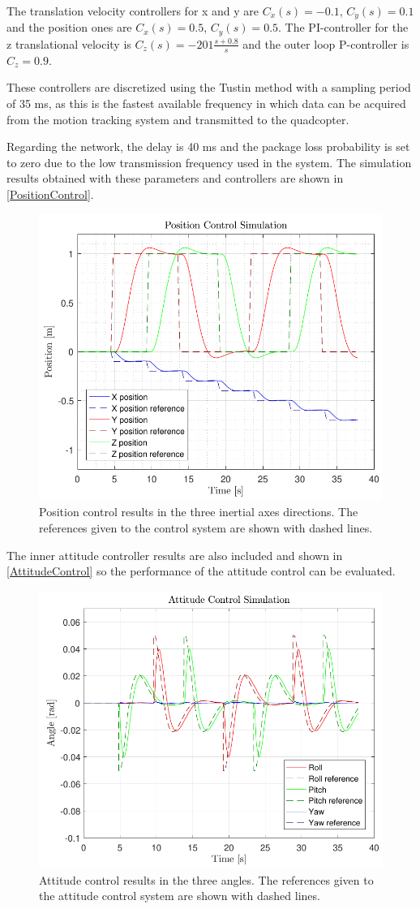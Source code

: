 The translation velocity controllers for x and y are $C_{\dot{x}}(s)= -0.1$, $C_{\dot{y}}(s)= 0.1$ and the position ones are $C_x(s)= 0.5$, $C_y(s)= 0.5$. The PI-controller for the z translational velocity is $C_{\dot{z}}(s)=-201\frac{s+0.8}{s}$ and the outer loop P-controller is $C_z=0.9$.

These controllers are discretized using the Tustin method with a sampling period of 35 ms, as this is the fastest available frequency in which data can be acquired from the motion tracking system and transmitted to the quadcopter.

Regarding the network, the delay is 40 ms and the package loss probability is set to zero due to the low transmission frequency used in the system.
The simulation results obtained with these parameters and controllers are shown in \autoref{PositionControl}.
\begin{figure}[H]
	\centering
	\includegraphics[width=.4\textwidth]{figures/PositionControl}
	\caption{Position control results in the three inertial axes directions. The references given to the control system are shown with dashed lines.}
	\label{PositionControl}
\end{figure}

The inner attitude controller results are also included and shown in \autoref{AttitudeControl} so the performance of the attitude control can be evaluated. 
\begin{figure}[H]
	\centering
	\includegraphics[width=.4\textwidth]{figures/AttitudeControl}
	\caption{Attitude control results in the three angles. The references given to the attitude control system are shown with dashed lines.}
	\label{AttitudeControl}
\end{figure}


